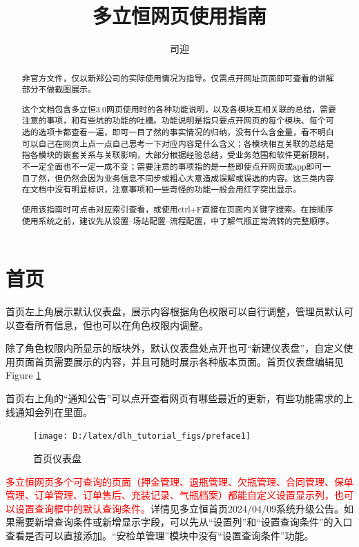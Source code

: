 \documentclass[UTF8]{ctexart}
\title{多立恒网页使用指南}
\author{司迎}
\begin{document}
\maketitle
\tableofcontents
\begin{abstract}
非官方文件，仅以新郑公司的实际使用情况为指导。仅需点开网址页面即可查看的讲解部分不做截图展示。

这个文档包含多立恒3.0网页使用时的各种功能说明，以及各模块互相关联的总结，需要注意的事项，和有些坑的功能的吐槽。功能说明是指只要点开网页的每个模块、每个可选的选项卡都查看一遍，即可一目了然的事实情况的归纳，没有什么含金量，看不明白可以自己在网页上点一点自己思考一下对应内容是什么含义；各模块相互关联的总结是指各模块的嵌套关系与关联影响，大部分根据经验总结，受业务范围和软件更新限制，不一定全面也不一定一成不变；需要注意的事项指的是一些即使点开网页或app即可一目了然，但仍然会因为业务信息不同步或粗心大意造成误解或误选的内容。这三类内容在文档中没有明显标识，注意事项和一些奇怪的功能一般会用红字突出显示。

使用该指南时可点击对应索引查看，或使用ctrl+F直接在页面内关键字搜索。在按顺序使用系统之前，建议先从设置--场站配置--流程配置，中了解气瓶正常流转的完整顺序。
\end{abstract}

\section{首页}

首页左上角展示默认仪表盘，展示内容根据角色权限可以自行调整，管理员默认可以查看所有信息，但也可以在角色权限内调整。

除了角色权限内所显示的版块外，默认仪表盘处点开也可“新建仪表盘”，自定义使用页面首页需要展示的内容，并且可随时展示各种版本页面。首页仪表盘编辑见Figure \ref{fig:preface1}

首页右上角的“通知公告”可以点开查看网页有哪些最近的更新，有些功能需求的上线通知会列在里面。
\begin{figure}[h]
	\centering
	\texttt{[image: D:/latex/dlh\_tutorial\_figs/preface1]}
	\caption{首页仪表盘}
	\label{fig:preface1}
\end{figure}

\textcolor{red}{多立恒网页多个可查询的页面（押金管理、退瓶管理、欠瓶管理、合同管理、保单管理、订单管理、订单售后、充装记录、气瓶档案）都能自定义设置显示列，也可以设置查询框中的默认查询条件。}详情见多立恒首页2024/04/09系统升级公告。如果需要新增查询条件或新增显示字段，可以先从“设置列”和“设置查询条件”的入口查看是否可以直接添加。“安检单管理”模块中没有“设置查询条件”功能。
\end{document}
